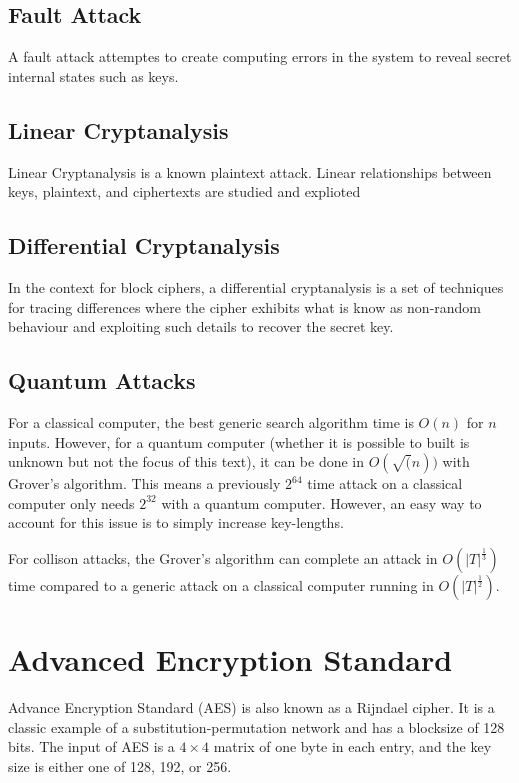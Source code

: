 \documentclass{article}
\begin{document}
\begin{multicols}{2}
\subsection{Fault Attack}

A fault attack attemptes to create computing errors in the system to reveal secret internal states such as keys.

\subsection{Linear Cryptanalysis}

Linear Cryptanalysis is a known plaintext attack. Linear relationships between keys, plaintext, and ciphertexts are studied and explioted

\subsection{Differential Cryptanalysis}

In the context for block ciphers, a differential cryptanalysis is a set of techniques for tracing differences where the cipher exhibits what is know as non-random behaviour and exploiting such details to recover the secret key.

\subsection{Quantum Attacks}

For a classical computer, the best generic search algorithm time is $O(n)$ for $n$ inputs. However, for a quantum computer (whether it is possible to built is unknown but not the focus of this text), it can be done in $O(\sqrt(n))$ with Grover's algorithm. This means a previously $2^{64}$ time attack on a classical computer only needs $2^{32}$ with a quantum computer. However, an easy way to 
account for this issue is to simply increase key-lengths.

For collison attacks, the Grover's algorithm can complete an attack in $O(|T|^{\frac{1}{3}})$ time compared to a generic attack on a classical computer running in $O(|T|^{\frac{1}{2}})$.

\section{Advanced Encryption Standard}

Advance Encryption Standard (AES) is also known as a Rijndael cipher. It is a classic example of a substitution-permutation network and has a blocksize of 128 bits. The input of AES is a $4 \times 4$ matrix of one byte in each entry, and the key size is either one of 128, 192, or 256. 


\end{multicols}
\end{document}
